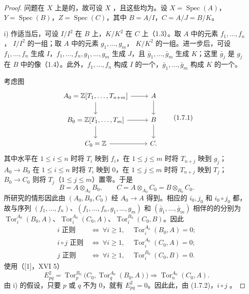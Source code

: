 \begin{proof}
问题在 $X$ 上是的，故可设 $X$ ，且这些均为。设 $X=\operatorname{Spec}(A)$，$Y=\operatorname{Spec}(B)$，$Z=\operatorname{Spec}(C)$，其中 $B=A/I$，$C=A/J=B/K$。

 i) 作适当后，可设 $I/I^2$ 在 $B$ 上，$K/K^2$ 在 $C$ 上（1.3）。取 $A$ 中的元素 $f_1,\ldots,f_n$， $I/I^2$ 的一组；取 $A$ 中的元素 $g_1,\ldots,g_m$， $K/K^2$ 的一组。进一步后，可设 $f_1,\ldots,f_n$ 生成 $I$，$f_1,\ldots,f_n,g_1,\ldots,g_m$ 生成 $J$，且 $\bar g_1,\ldots,\bar g_m$ 生成 $K$；这里 $\bar g_j$ 是 $g_j$ 在 $B$ 中的像（1.4）。此外，$f_1,\ldots,f_n$ 构成 $I$ 的一个，$\bar g_1,\ldots,\bar g_m$ 构成 $K$ 的一个。

考虑图
\[
\begin{tikzcd}
A_0=\mathbb Z[T_1,\ldots,T_{n+m}]\arrow[r]\arrow[d]&A\arrow[d]\\
B_0=\mathbb Z[T_1,\ldots,T_m]\arrow[r]\arrow[d]&B\arrow[d]\\
C_0=\mathbb Z\arrow[r]&C.
\end{tikzcd}\tag{1.7.1}
\]
其中水平在 $1\leq i\leq n$ 时将 $T_i$ 映到 $f_i$，在 $1\leq j\leq m$ 时将 $T_{n+j}$ 映到 $g_j$； $A_0\to B_0$ 在 $1\leq i\leq n$ 时将 $T_i$ 映到 $0$，在 $1\leq j\leq m$ 时将 $T_{n+j}$ 映到 $T_j$； $B_0\to C_0$ 则将 $T_j$（$1\leq j\leq m$）置零。于是
\[
B=A\otimes_{A_0}B_0,\qquad C=A\otimes_{A_0}C_0=B\otimes_{B_0}C_0.
\]
所研究的情形因此由 $(A_0,B_0,C_0)$ 经 $A_0\to A$ 得到。相应的 $i_0,j_0$ 和 $i_0\circ j_0$ 都，故与序列 $(f_1,\ldots,f_n)$、$(f_1,\ldots,f_n,g_1,\ldots,g_m)$ 和 $(\bar g_1,\ldots,\bar g_m)$ 相伴的的分别为 $\operatorname{Tor}_i^{A_0}(B_0,A)$、$\operatorname{Tor}_i^{A_0}(C_0,A)$、$\operatorname{Tor}_i^{B_0}(C_0,B)$。因此
\[
\begin{aligned}
i\text{ 正则}&\ \Longleftrightarrow\ \forall i\geq1,\quad\operatorname{Tor}_i^{A_0}(B_0,A)=0;\\
i\circ j\text{ 正则}&\ \Longleftrightarrow\ \forall i\geq1,\quad\operatorname{Tor}_i^{A_0}(C_0,A)=0;\\
j\text{ 正则}&\ \Longleftrightarrow\ \forall i\geq1,\quad\operatorname{Tor}_i^{B_0}(C_0,B)=0.
\end{aligned}\tag{1.7.2}
\]
使用（[1]，XVI 5）
\[
E^2_{pq}=\operatorname{Tor}_p^{B_0}\bigl(C_0,\operatorname{Tor}_q^{A_0}(B_0,A)\bigr)\Longrightarrow\operatorname{Tor}_n^{A_0}(C_0,A).\tag{1.7.3}
\]
由 i) 的假设，只要 $p$ 或 $q$ 不为 $0$，就有 $E^2_{pq}=0$。因此此，由 (1.7.2)，$i\circ j$ 。


\end{proof}
